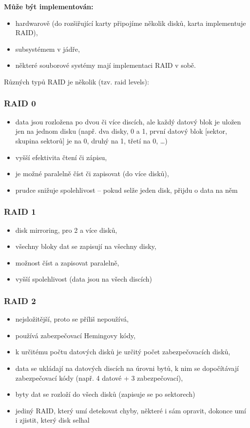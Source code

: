 \documentclass[a4paper, 11pt]{article}
\begin{document}
\textbf{Může být implementován:}
\begin{itemize}
    \item hardwarově (do rozšiřující karty připojíme několik disků, karta implementuje RAID),
    \item subsystémem v jádře,
    \item některé souborové systémy mají implementaci RAID v sobě.
\end{itemize}
 
Různých typů RAID je několik (tzv. raid levels):
 
\subsubsection{RAID 0}
\begin{itemize}
    \item data jsou rozložena po dvou či více discích, ale každý datový blok je uložen jen na jednom disku (např. dva disky, 0 a 1, první datový blok [sektor, skupina sektorů] je na 0, druhý na 1, třetí na 0, \ldots)
    \item vyšší efektivita čtení či zápisu,
    \item je možné paralelně číst či zapisovat (do více disků),
    \item prudce snižuje spolehlivost -- pokud selže jeden disk, přijdu o data na něm
\end{itemize}
 
\subsubsection{RAID 1}
\begin{itemize}
    \item disk mirroring, pro 2 a více disků,
    \item všechny bloky dat se zapisují na všechny disky,
    \item možnost číst a zapisovat paralelně,
    \item vyšší spolehlivost (data jsou na všech discích)
\end{itemize}
 
\subsubsection{RAID 2}
\begin{itemize}
    \item nejsložitější, proto se příliš nepoužívá,
    \item používá zabezpečovací Hemingovy kódy,
    \item k určitému počtu datových disků je určitý počet zabezpečovacích disků,
    \item data se ukládají na datových discích na úrovni bytů, k nim se dopočítávají zabezpečovací kódy (např. 4 datové + 3 zabezpečovací),
    \item byty dat se rozloží do všech disků (zapisuje se po sektorech)
    \item jediný RAID, který umí detekovat chyby, některé i sám opravit, dokonce umí i zjistit, který disk selhal
\end{itemize}
\end{document}
